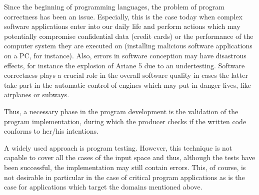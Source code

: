 
Since the beginning of programming languages, the problem of program correctness has been an issue. 
Especially, this is the case today when complex software applications  enter into our daily life and perform actions 
which may potentially compromise confidential data (credit cards) or the performance of the
 computer system they are executed on (installing malicious software applications on a PC, for instance). 
Also, errors in software conception may have disastrous effects, for instance 
the explosion of Ariane 5 due to an undertesting. Software correctness
 plays a crucial role in the overall software quality  in cases the latter take part in the automatic 
control of engines which may put in danger lives, like airplanes or subways.


Thus, a necessary phase in the program development is the validation of the program implementation, during which 
the producer checks if the written code conforms to her/his intentions. 


A widely used approach is program testing. However, this technique is not capable
to cover all the cases of the input space and thus, although the tests have been successful, 
the implementation may still contain errors. This, of course, is not desirable in particular in the case of critical 
program applications as is the case for applications which target the domains mentioned above.


